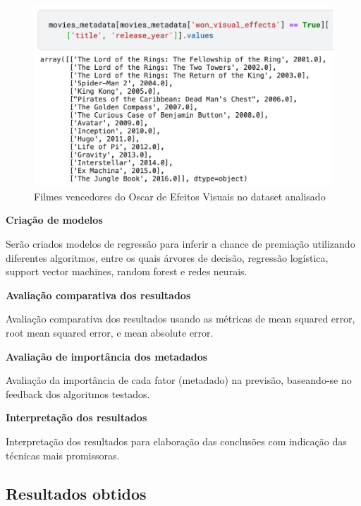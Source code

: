             \begin{figure}[htb]
            	\caption{\label{vencedores_efeitos}Filmes vencedores do Oscar de Efeitos Visuais no dataset analisado}
            	\begin{center}
            		\includegraphics[scale=0.7]{vencedores_efeitos.png}
            	\end{center}
            \end{figure}

            \textbf{Criação de modelos}\par
            Serão criados modelos de regressão para inferir a chance de premiação utilizando diferentes algoritmos, entre os quais árvores de decisão, regressão logística, support vector machines, random forest e redes neurais.\newline
    
            \textbf{Avaliação comparativa dos resultados}\par
            Avaliação comparativa dos resultados usando as métricas de mean squared error, root mean squared error, e mean absolute error.\newline
    
            \textbf{Avaliação de importância dos metadados}\par
            Avaliação da importância de cada fator (metadado) na previsão, baseando-se no feedback dos algoritmos testados.\newline
    
            \textbf{Interpretação dos resultados}\par
            Interpretação dos resultados para elaboração das conclusões com indicação das técnicas mais promissoras.\newline

        \subsection{Resultados obtidos}

